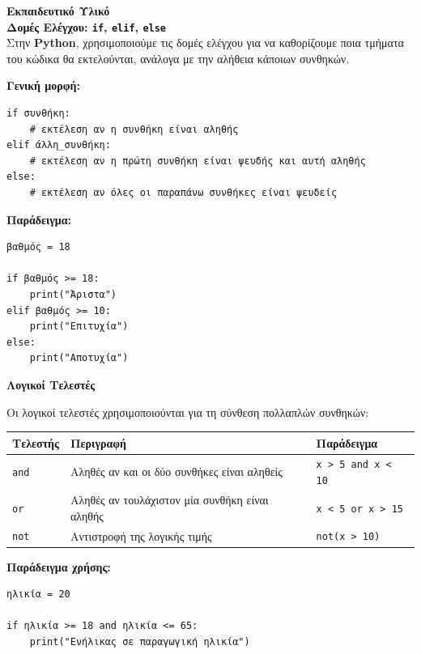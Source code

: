 \documentclass[11pt]{report}
\begin{document}
\vspace{1em}
\textbf{Εκπαιδευτικό Υλικό} \\

\textbf{Δομές Ελέγχου: \texttt{if}, \texttt{elif}, \texttt{else}} \\[0.5em]
Στην \textbf{Python}, χρησιμοποιούμε τις δομές ελέγχου για να καθορίζουμε ποια τμήματα του κώδικα θα εκτελούνται, ανάλογα με την αλήθεια κάποιων συνθηκών.

\textbf{Γενική μορφή:}
\begin{tcolorbox}[colback=gray!5!white, colframe=black!75!black]
\begin{verbatim}
if συνθήκη:
    # εκτέλεση αν η συνθήκη είναι αληθής
elif άλλη_συνθήκη:
    # εκτέλεση αν η πρώτη συνθήκη είναι ψευδής και αυτή αληθής
else:
    # εκτέλεση αν όλες οι παραπάνω συνθήκες είναι ψευδείς
\end{verbatim}
\end{tcolorbox}

\textbf{Παράδειγμα:}
\begin{tcolorbox}[colback=gray!5!white, colframe=black!75!black]
\begin{verbatim}
βαθμός = 18

if βαθμός >= 18:
    print("Άριστα")
elif βαθμός >= 10:
    print("Επιτυχία")
else:
    print("Αποτυχία")
\end{verbatim}
\end{tcolorbox}

\vspace{1em}
\textbf{Λογικοί Τελεστές}

Οι λογικοί τελεστές χρησιμοποιούνται για τη σύνθεση πολλαπλών συνθηκών:

\begin{tabular}{|l|l|l|}
\hline
\textbf{Τελεστής} & \textbf{Περιγραφή} & \textbf{Παράδειγμα} \\
\hline
\texttt{and} & Αληθές αν και οι δύο συνθήκες είναι αληθείς & \texttt{x > 5 and x < 10} \\
\texttt{or}  & Αληθές αν τουλάχιστον μία συνθήκη είναι αληθής & \texttt{x < 5 or x > 15} \\
\texttt{not} & Αντιστροφή της λογικής τιμής & \texttt{not(x > 10)} \\
\hline
\end{tabular}

\vspace{1em}
\textbf{Παράδειγμα χρήσης:}
\begin{tcolorbox}[colback=gray!5!white, colframe=black!75!black]
\begin{verbatim}
ηλικία = 20

if ηλικία >= 18 and ηλικία <= 65:
    print("Ενήλικας σε παραγωγική ηλικία")
\end{verbatim}
\end{tcolorbox}
\end{document}
